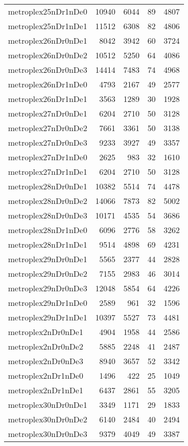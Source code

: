 \begin{longtable}{lrrrr}
metroplex25nDr1nDe0 & 10940 & 6044 & 89 & 4807 \\
metroplex25nDr1nDe1 & 11512 & 6308 & 82 & 4806 \\
metroplex26nDr0nDe1 & 8042 & 3942 & 60 & 3724 \\
metroplex26nDr0nDe2 & 10512 & 5250 & 64 & 4086 \\
metroplex26nDr0nDe3 & 14414 & 7483 & 74 & 4968 \\
metroplex26nDr1nDe0 & 4793 & 2167 & 49 & 2577 \\
metroplex26nDr1nDe1 & 3563 & 1289 & 30 & 1928 \\
metroplex27nDr0nDe1 & 6204 & 2710 & 50 & 3128 \\
metroplex27nDr0nDe2 & 7661 & 3361 & 50 & 3138 \\
metroplex27nDr0nDe3 & 9233 & 3927 & 49 & 3357 \\
metroplex27nDr1nDe0 & 2625 & 983 & 32 & 1610 \\
metroplex27nDr1nDe1 & 6204 & 2710 & 50 & 3128 \\
metroplex28nDr0nDe1 & 10382 & 5514 & 74 & 4478 \\
metroplex28nDr0nDe2 & 14066 & 7873 & 82 & 5002 \\
metroplex28nDr0nDe3 & 10171 & 4535 & 54 & 3686 \\
metroplex28nDr1nDe0 & 6096 & 2776 & 58 & 3262 \\
metroplex28nDr1nDe1 & 9514 & 4898 & 69 & 4231 \\
metroplex29nDr0nDe1 & 5565 & 2377 & 44 & 2828 \\
metroplex29nDr0nDe2 & 7155 & 2983 & 46 & 3014 \\
metroplex29nDr0nDe3 & 12048 & 5854 & 64 & 4226 \\
metroplex29nDr1nDe0 & 2589 & 961 & 32 & 1596 \\
metroplex29nDr1nDe1 & 10397 & 5527 & 73 & 4481 \\
metroplex2nDr0nDe1 & 4904 & 1958 & 44 & 2586 \\
metroplex2nDr0nDe2 & 5885 & 2248 & 41 & 2487 \\
metroplex2nDr0nDe3 & 8940 & 3657 & 52 & 3342 \\
metroplex2nDr1nDe0 & 1496 & 422 & 25 & 1049 \\
metroplex2nDr1nDe1 & 6437 & 2861 & 55 & 3205 \\
metroplex30nDr0nDe1 & 3349 & 1171 & 29 & 1833 \\
metroplex30nDr0nDe2 & 6140 & 2484 & 40 & 2494 \\
metroplex30nDr0nDe3 & 9379 & 4049 & 49 & 3387 \\

\end{longtable}
